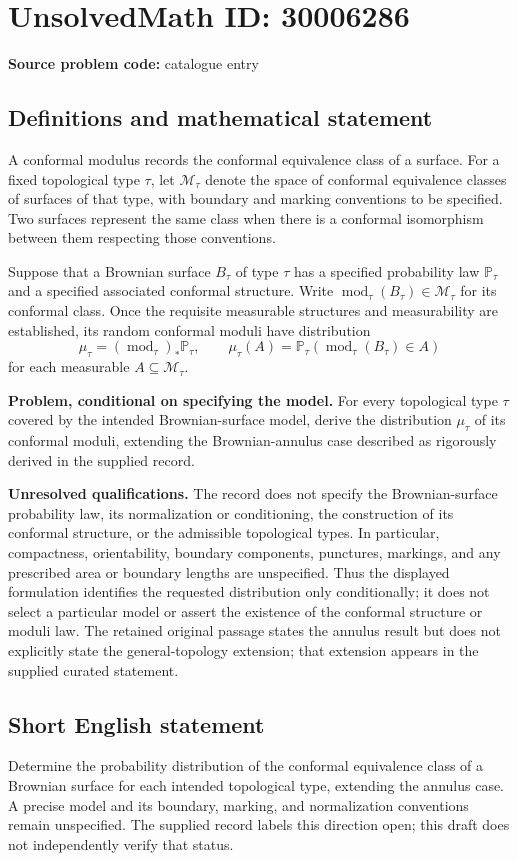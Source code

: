 \documentclass[11pt]{article}
\begin{document}
\section*{UnsolvedMath ID: 30006286}
\textbf{Source problem code:} catalogue entry
\subsection{Definitions and mathematical statement}
A conformal modulus records the conformal equivalence class of a surface. For a fixed topological type \(\tau\), let \(\mathcal M_\tau\) denote the space of conformal equivalence classes of surfaces of that type, with boundary and marking conventions to be specified. Two surfaces represent the same class when there is a conformal isomorphism between them respecting those conventions.

Suppose that a Brownian surface \(B_\tau\) of type \(\tau\) has a specified probability law \(\mathbb P_\tau\) and a specified associated conformal structure. Write \(\operatorname{mod}_\tau(B_\tau)\in\mathcal M_\tau\) for its conformal class. Once the requisite measurable structures and measurability are established, its random conformal moduli have distribution
\[
\mu_\tau=(\operatorname{mod}_\tau)_*\mathbb P_\tau,
\qquad
\mu_\tau(A)=\mathbb P_\tau\!\left(\operatorname{mod}_\tau(B_\tau)\in A\right)
\]
for each measurable \(A\subseteq\mathcal M_\tau\).

\textbf{Problem, conditional on specifying the model.} For every topological type \(\tau\) covered by the intended Brownian-surface model, derive the distribution \(\mu_\tau\) of its conformal moduli, extending the Brownian-annulus case described as rigorously derived in the supplied record.

\textbf{Unresolved qualifications.} The record does not specify the Brownian-surface probability law, its normalization or conditioning, the construction of its conformal structure, or the admissible topological types. In particular, compactness, orientability, boundary components, punctures, markings, and any prescribed area or boundary lengths are unspecified. Thus the displayed formulation identifies the requested distribution only conditionally; it does not select a particular model or assert the existence of the conformal structure or moduli law. The retained original passage states the annulus result but does not explicitly state the general-topology extension; that extension appears in the supplied curated statement.
\subsection{Short English statement}
Determine the probability distribution of the conformal equivalence class of a Brownian surface for each intended topological type, extending the annulus case. A precise model and its boundary, marking, and normalization conventions remain unspecified. The supplied record labels this direction open; this draft does not independently verify that status.
\end{document}
